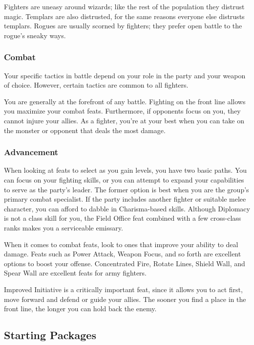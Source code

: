 Fighters are uneasy around wizards; like the rest of the population they distrust magic. Templars are also distrusted, for the same reasons everyone else distrusts templars. Rogues are usually scorned by fighters; they prefer open battle to the rogue's sneaky ways.

\subsubsection{Combat}

Your specific tactics in battle depend on your role in the party and your weapon of choice. However, certain tactics are common to all fighters.

You are generally at the forefront of any battle. Fighting on the front line allows you maximize your combat feats. Furthermore, if opponents focus on you, they cannot injure your allies. As a fighter, you're at your best when you can take on the monster or opponent that deals the most damage.

\subsubsection{Advancement}

When looking at feats to select as you gain levels, you have two basic paths. You can focus on your fighting skills, or you can attempt to expand your capabilities to serve as the party's leader. The former option is best when you are the group's primary combat specialist. If the party includes another fighter or suitable melee character, you can afford to dabble in Charisma-based skills. Although Diplomacy is not a class skill for you, the Field Office feat combined with a few cross-class ranks makes you a serviceable emissary.

When it comes to combat feats, look to ones that improve your ability to deal damage. Feats such as Power Attack, Weapon Focus, and so forth are excellent options to boost your offense. Concentrated Fire, Rotate Lines, Shield Wall, and Spear Wall are excellent feats for army fighters.

Improved Initiative is a critically important feat, since it allows you to act first, move forward and defend or guide your allies. The sooner you find a place in the front line, the longer you can hold back the enemy.

\subsection{Starting Packages}

